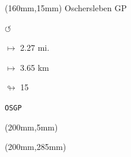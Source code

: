 \begin{textblock*}{40mm}(160mm,15mm)%
Oschersleben GP
\par \Huge$\circlearrowleft$
\Large
\par$\mapsto$ 2.27 mi.
\par$\mapsto$ 3.65 km
\par$\looparrowright$ 15
\par\hfill\tiny\tt OSGP\\
\end{textblock*}
\begin{textblock*}{20mm}(200mm,5mm)%
\fbox{\thepage}
\end{textblock*}
\begin{textblock*}{20mm}(200mm,285mm)%
\fbox{\thepage}
\end{textblock*}
\null\newpage

